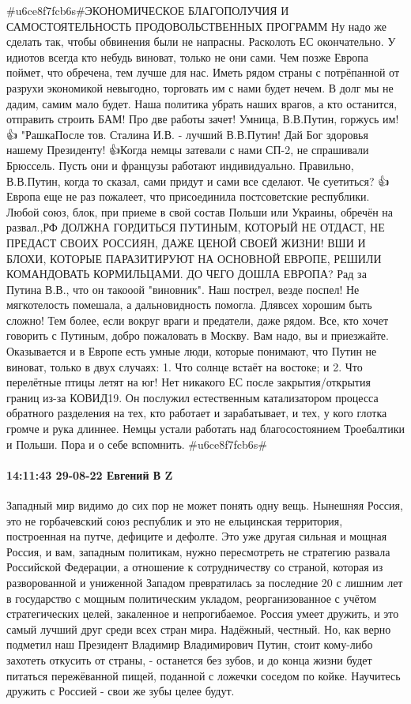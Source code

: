 #u6ce8f7fcb6s#ЭКОНОМИЧЕСКОЕ БЛАГОПОЛУЧИЯ И САМОСТОЯТЕЛЬНОСТЬ ПРОДОВОЛЬСТВЕННЫХ ПРОГРАММ
Ну надо же сделать так, чтобы обвинения были не напрасны. Расколоть ЕС окончательно. У идиотов всегда кто
небудь виноват, только не они сами. Чем позже Европа поймет, что
обречена, тем лучше для нас. Иметь рядом страны с потрёпанной от разрухи
экономикой невыгодно, торговать им с нами будет нечем. В долг мы не
дадим, самим мало будет. Наша политика убрать наших врагов, а кто
останится, отправить строить БАМ! Про две работы зачет! Умница,
В.В.Путин, горжусь им! 👍 "РашкаПосле тов. Сталина И.В. - лучший В.В.Путин! Дай Бог здоровья нашему Президенту! 👍Когда немцы затевали с нами СП-2, не спрашивали Брюссель. Пусть они и
французы работают индивидуально. Правильно, В.В.Путин, когда то сказал,
сами придут и сами все сделают. Че суетиться? 👍Европа еще не раз пожалеет, что присоединила постсоветские республики.
Любой союз, блок, при приеме в свой состав Польши или Украины, обречён
на развал.,РФ ДОЛЖНА ГОРДИТЬСЯ ПУТИНЫМ, КОТОРЫЙ НЕ ОТДАСТ, НЕ ПРЕДАСТ СВОИХ
РОССИЯН, ДАЖЕ ЦЕНОЙ СВОЕЙ ЖИЗНИ! ВШИ И БЛОХИ, КОТОРЫЕ ПАРАЗИТИРУЮТ НА
ОСНОВНОЙ ЕВРОПЕ, РЕШИЛИ КОМАНДОВАТЬ КОРМИЛЬЦАМИ. ДО ЧЕГО ДОШЛА ЕВРОПА? Рад за Путина В.В., что он такооой
"виновник". Наш пострел, везде поспел! Не мягкотелость помешала, а
дальновидность помогла. Длявсех хорошим быть сложно! Тем более, если вокруг враги и предатели, даже
рядом. Все, кто хочет говорить с Путиным, добро пожаловать в Москву.
Вам надо, вы и приезжайте. Оказывается и в Европе есть умные люди,
которые понимают, что Путин не виноват, только в двух случаях: 1. Что
солнце встаёт на востоке; и 2. Что перелётные птицы летят на юг! Нет никакого ЕС после закрытия/открытия границ из-за КОВИД19. Он
послужил естественным катализатором процесса обратного разделения на
тех, кто работает и зарабатывает, и тех, у кого глотка громче и рука длиннее. Немцы устали
работать над благосостоянием Троебалтики и Польши. Пора и о себе
вспомнить. #u6ce8f7fcb6s#

\paragraph{14:11:43 29-08-22 Евгений В Z}

Западный мир видимо до сих пор не может понять одну вещь. Нынешняя Россия, это не горбачевский союз республик и это не ельцинская территория, построенная на путче, дефиците и дефолте.
Это уже другая сильная и мощная Россия, и вам, западным политикам, нужно пересмотреть не стратегию развала Российской Федерации, а отношение к сотрудничеству со страной, которая из разворованной и униженной Западом превратилась за последние 20 с лишним лет в государство с мощным политическим укладом, реорганизованное с учётом стратегических целей, закаленное и непрогибаемое.
Россия умеет дружить, и это самый лучший друг среди всех стран мира. Надёжный, честный. Но, как верно подметил наш Президент Владимир Владимирович Путин, стоит кому-либо захотеть откусить от страны, - останется без зубов, и до конца жизни будет питаться пережёванной пищей, поданной с ложечки соседом по койке.
Научитесь дружить с Россией - свои же зубы целее будут.


